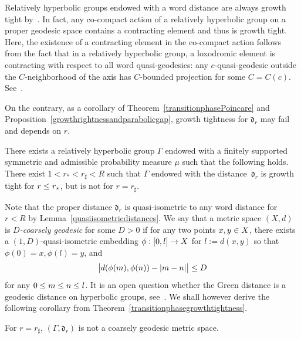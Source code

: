 \documentclass[AHL,Unicode,longabstracts]{cedram}
\newcommand{\fkd}{\mathfrak{d}}
\let\oldin\in
\renewcommand{\in}{\mathchoice{\oldin}{\oldin}{\,\oldin\,}{\,\oldin\,}}
\let\oldle\le
\renewcommand{\le}{\mathchoice{\oldle}{\oldle}{\,\oldle\,}{\,\oldle\,}}
\renewcommand*{\to}{\mathchoice{\longrightarrow}{\rightarrow}{\rightarrow}{\rightarrow}}
\begin{document}
Relatively hyperbolic groups endowed with a word distance are always growth tight by~\cite{ACT,YangTight}. In fact, any co-compact action of a relatively hyperbolic group on a proper geodesic space contains a contracting element and thus is growth tight. Here, the existence of a contracting element in the co-compact action follows from the fact that in a relatively hyperbolic group, a loxodromic element is contracting with respect to all word quasi-geodesics: any $c$-quasi-geodesic outside the $C$-neighborhood of the axis has $C$-bounded projection for some $C=C(c)$. See~\cite[Proposition~8.5]{GP16}.

On the contrary, as a corollary of Theorem~\ref{transitionphasePoincare} and Proposition~\ref{growthrightnessandparabolicgap}, growth tightness for $\fkd_r$ may fail and depends on $r$.

\begin{theo}\label{transitionphasegrowthtightness}
There exists a relatively hyperbolic group $\Gamma$ endowed with a finitely supported symmetric and admissible probability measure $\mu$ such that the following holds. There exist $1<r_*<r_\sharp<R$ such that $\Gamma$ endowed with the distance~$\fkd_r$ is growth tight for $r\le r_*$, but is not for $r=r_\sharp$.
\end{theo}



Note that the proper distance $\fkd_r$ is quasi-isometric to any word distance for $r<R$ by Lemma~\ref{quasiisometricdistances}. We say that a metric space $(X,d)$ is \emph{$D$-coarsely geodesic} for some\pagebreak{} $D>0$ if for any two points $x,y\in X$, there exists a $(1,D)$-quasi-isometric embedding $\phi: [0, l]\to X$ for $l:=d(x,y)$ so that $\phi(0)=x,\phi(l)=y$, and
\[
\bigl|d(\phi(m), \phi(n))-|m-n|\bigr|\le D
\]
for any $0\le m\le n\le l$. It is an open question whether the Green distance is a geodesic distance on hyperbolic groups, see~\cite[Section~1.7]{BHM11}. We shall however derive the following corollary from Theorem~\ref{transitionphasegrowthtightness}.

\begin{coro}\label{drnotgeodesic}
For $r=r_\sharp$, $(\Gamma,\fkd_r)$ is not a coarsely geodesic metric space.
\end{coro}
\end{document}
